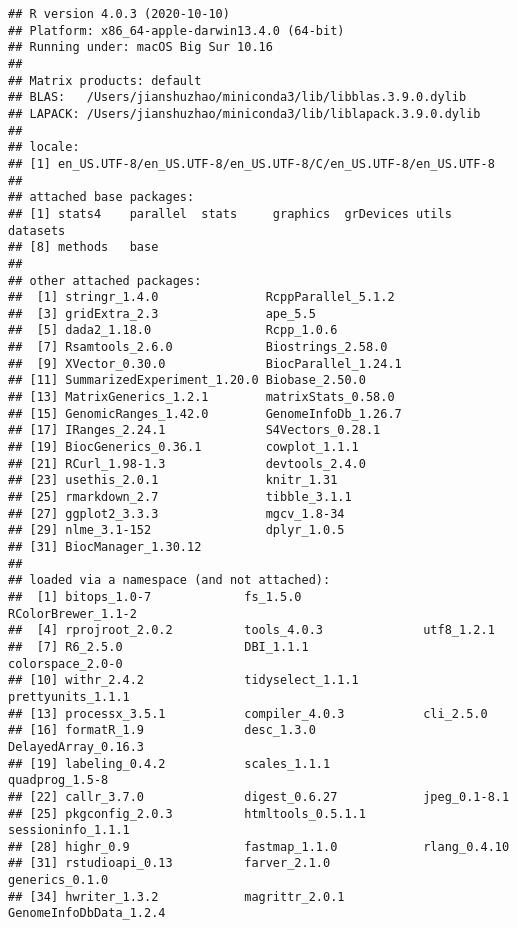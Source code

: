 \documentclass[
]{article}
\begin{document}
\begin{verbatim}
## R version 4.0.3 (2020-10-10)
## Platform: x86_64-apple-darwin13.4.0 (64-bit)
## Running under: macOS Big Sur 10.16
## 
## Matrix products: default
## BLAS:   /Users/jianshuzhao/miniconda3/lib/libblas.3.9.0.dylib
## LAPACK: /Users/jianshuzhao/miniconda3/lib/liblapack.3.9.0.dylib
## 
## locale:
## [1] en_US.UTF-8/en_US.UTF-8/en_US.UTF-8/C/en_US.UTF-8/en_US.UTF-8
## 
## attached base packages:
## [1] stats4    parallel  stats     graphics  grDevices utils     datasets 
## [8] methods   base     
## 
## other attached packages:
##  [1] stringr_1.4.0               RcppParallel_5.1.2         
##  [3] gridExtra_2.3               ape_5.5                    
##  [5] dada2_1.18.0                Rcpp_1.0.6                 
##  [7] Rsamtools_2.6.0             Biostrings_2.58.0          
##  [9] XVector_0.30.0              BiocParallel_1.24.1        
## [11] SummarizedExperiment_1.20.0 Biobase_2.50.0             
## [13] MatrixGenerics_1.2.1        matrixStats_0.58.0         
## [15] GenomicRanges_1.42.0        GenomeInfoDb_1.26.7        
## [17] IRanges_2.24.1              S4Vectors_0.28.1           
## [19] BiocGenerics_0.36.1         cowplot_1.1.1              
## [21] RCurl_1.98-1.3              devtools_2.4.0             
## [23] usethis_2.0.1               knitr_1.31                 
## [25] rmarkdown_2.7               tibble_3.1.1               
## [27] ggplot2_3.3.3               mgcv_1.8-34                
## [29] nlme_3.1-152                dplyr_1.0.5                
## [31] BiocManager_1.30.12        
## 
## loaded via a namespace (and not attached):
##  [1] bitops_1.0-7             fs_1.5.0                 RColorBrewer_1.1-2      
##  [4] rprojroot_2.0.2          tools_4.0.3              utf8_1.2.1              
##  [7] R6_2.5.0                 DBI_1.1.1                colorspace_2.0-0        
## [10] withr_2.4.2              tidyselect_1.1.1         prettyunits_1.1.1       
## [13] processx_3.5.1           compiler_4.0.3           cli_2.5.0               
## [16] formatR_1.9              desc_1.3.0               DelayedArray_0.16.3     
## [19] labeling_0.4.2           scales_1.1.1             quadprog_1.5-8          
## [22] callr_3.7.0              digest_0.6.27            jpeg_0.1-8.1            
## [25] pkgconfig_2.0.3          htmltools_0.5.1.1        sessioninfo_1.1.1       
## [28] highr_0.9                fastmap_1.1.0            rlang_0.4.10            
## [31] rstudioapi_0.13          farver_2.1.0             generics_0.1.0          
## [34] hwriter_1.3.2            magrittr_2.0.1           GenomeInfoDbData_1.2.4  

\end{verbatim}
\end{document}
